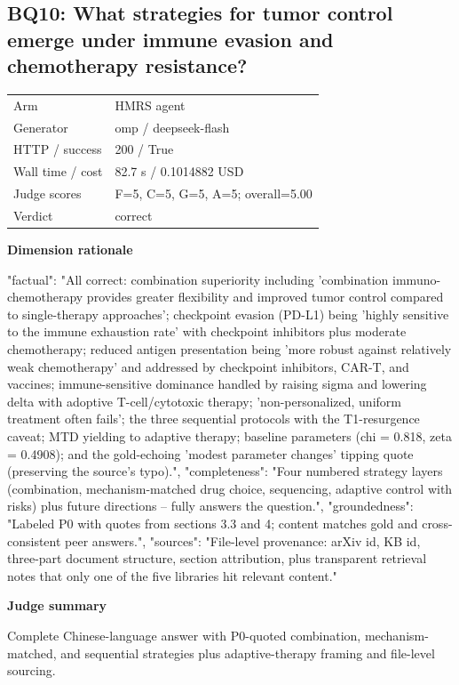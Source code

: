 \documentclass[10pt]{article}
\begin{document}
\subsection{BQ10: What strategies for tumor control emerge under immune evasion and chemotherapy resistance?}
\begin{tabular}{@{}ll@{}}
Arm & HMRS agent\\
Generator & omp / deepseek-flash\\
HTTP / success & 200 / True\\
Wall time / cost & 82.7 s / 0.1014882 USD\\
Judge scores & F=5, C=5, G=5, A=5; overall=5.00\\
Verdict & correct\\
\end{tabular}

\textbf{Dimension rationale}
\begin{EvidenceText}
{
  "factual": "All correct: combination superiority including 'combination immuno-chemotherapy provides greater flexibility and improved tumor control compared to single-therapy approaches'; checkpoint evasion (PD-L1) being 'highly sensitive to the immune exhaustion rate' with checkpoint inhibitors plus moderate chemotherapy; reduced antigen presentation being 'more robust against relatively weak chemotherapy' and addressed by checkpoint inhibitors, CAR-T, and vaccines; immune-sensitive dominance handled by raising sigma and lowering delta with adoptive T-cell/cytotoxic therapy; 'non-personalized, uniform treatment often fails'; the three sequential protocols with the T1-resurgence caveat; MTD yielding to adaptive therapy; baseline parameters (chi = 0.818, zeta = 0.4908); and the gold-echoing 'modest parameter changes' tipping quote (preserving the source's typo).",
  "completeness": "Four numbered strategy layers (combination, mechanism-matched drug choice, sequencing, adaptive control with risks) plus future directions -- fully answers the question.",
  "groundedness": "Labeled P0 with quotes from sections 3.3 and 4; content matches gold and cross-consistent peer answers.",
  "sources": "File-level provenance: arXiv id, KB id, three-part document structure, section attribution, plus transparent retrieval notes that only one of the five libraries hit relevant content."
}
\end{EvidenceText}

\textbf{Judge summary}
\begin{EvidenceText}
Complete Chinese-language answer with P0-quoted combination, mechanism-matched, and sequential strategies plus adaptive-therapy framing and file-level sourcing.
\end{EvidenceText}
\end{document}

